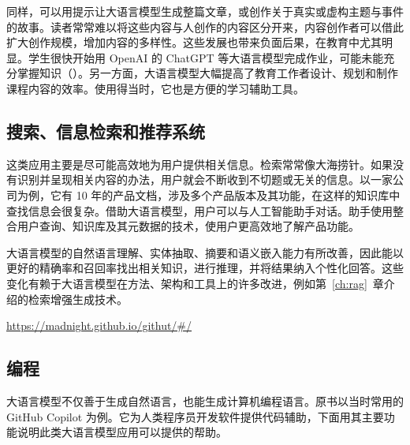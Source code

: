 同样，可以用提示让大语言模型生成整篇文章，或创作关于真实或虚构主题与事件的故事。读者常常难以将这些内容与人创作的内容区分开来，内容创作者可以借此扩大创作规模，增加内容的多样性。这些发展也带来负面后果，在教育中尤其明显。学生很快开始用 OpenAI 的 ChatGPT 等大语言模型完成作业，可能未能充分掌握知识（）。另一方面，大语言模型大幅提高了教育工作者设计、规划和制作课程内容的效率。使用得当时，它也是方便的学习辅助工具。

\subsection{搜索、信息检索和推荐系统}
这类应用主要是尽可能高效地为用户提供相关信息。检索常常像大海捞针。如果没有识别并呈现相关内容的办法，用户就会不断收到不切题或无关的信息。以一家公司为例，它有 10 年的产品文档，涉及多个产品版本及其功能，在这样的知识库中查找信息会很复杂。借助大语言模型，用户可以与人工智能助手对话。助手使用整合用户查询、知识库及其元数据的技术，使用户更高效地了解产品功能。

大语言模型的自然语言理解、实体抽取、摘要和语义嵌入能力有所改善，因此能以更好的精确率和召回率找出相关知识，进行推理，并将结果纳入个性化回答。这些变化有赖于大语言模型在方法、架构和工具上的许多改进，例如第~\ref{ch:rag}~章介绍的检索增强生成技术。

\urldef\githuturl\url{https://madnight.github.io/githut/#/}
\subsection{编程}
大语言模型不仅善于生成自然语言，也能生成计算机编程语言。原书以当时常用的 GitHub Copilot 为例。它为人类程序员开发软件提供代码辅助，下面用其主要功能说明此类大语言模型应用可以提供的帮助。

